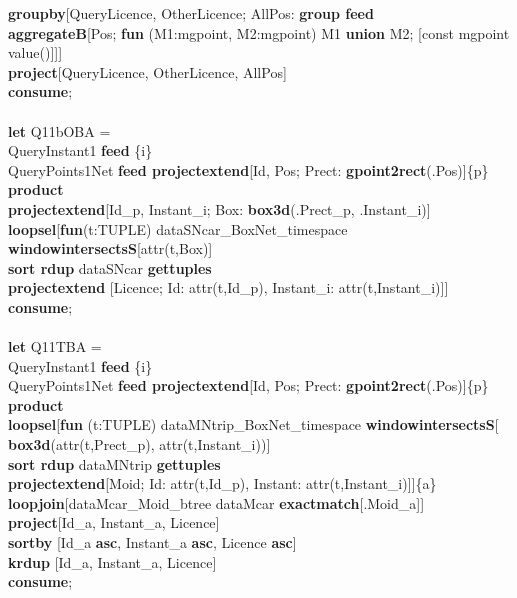 \documentclass[a4paper]{article}
\newcommand{\op}[1]{\textbf{#1}}
\begin{document}
\begin{scriptsize}
\begin{tabbing}
\>\op{groupby}[QueryLicence, OtherLicence; AllPos: \op{group feed}\\
\>\>\>\op{aggregateB}[Pos; \op{fun} (M1:mgpoint, M2:mgpoint) M1 \op{union} M2;
[const mgpoint value()]]]\\
\>\op{project}[QueryLicence, OtherLicence, AllPos]\\
\op{consume};\\
\\
\op{let} Q11bOBA =\\
\>QueryInstant1 \op{feed} \{i\}\\
\>QueryPoints1Net \op{feed projectextend}[Id, Pos; Prect:
\op{gpoint2rect}(.Pos)]\{p\}\\
\>\op{product}\\
\>\op{projectextend}[Id\_p, Instant\_i; Box: \op{box3d}(.Prect\_p,
.Instant\_i)]\\
\>\op{loopsel}[\op{fun}(t:TUPLE) dataSNcar\_BoxNet\_timespace
\op{windowintersectsS}[attr(t,Box)]\\
\>\>\op{sort rdup} dataSNcar \op{gettuples}\\
\>\>\op{projectextend} [Licence; Id: attr(t,Id\_p), Instant\_i:
attr(t,Instant\_i)]]\\
\op{consume};\\
\\
\op{let} Q11TBA =\\
\>QueryInstant1 \op{feed} \{i\}\\
\>QueryPoints1Net \op{feed projectextend}[Id, Pos; Prect:
\op{gpoint2rect}(.Pos)]\{p\}\\
\>\op{product}\\
\>\op{loopsel}[\op{fun} (t:TUPLE) dataMNtrip\_BoxNet\_timespace
\op{windowintersectsS}[\\
\>\>\>\op{box3d}(attr(t,Prect\_p), attr(t,Instant\_i))]\\
\>\>\op{sort rdup} dataMNtrip \op{gettuples}\\
\>\>\op{projectextend}[Moid; Id: attr(t,Id\_p), Instant:
attr(t,Instant\_i)]]\{a\}\\
\>\op{loopjoin}[dataMcar\_Moid\_btree dataMcar \op{exactmatch}[.Moid\_a]]\\
\>\op{project}[Id\_a, Instant\_a, Licence]\\
\>\op{sortby} [Id\_a \op{asc}, Instant\_a \op{asc}, Licence \op{asc}]\\
\>\op{krdup} [Id\_a, Instant\_a, Licence]\\
\op{consume};\\
\\

\end{tabbing}
\end{scriptsize}
\end{document}
